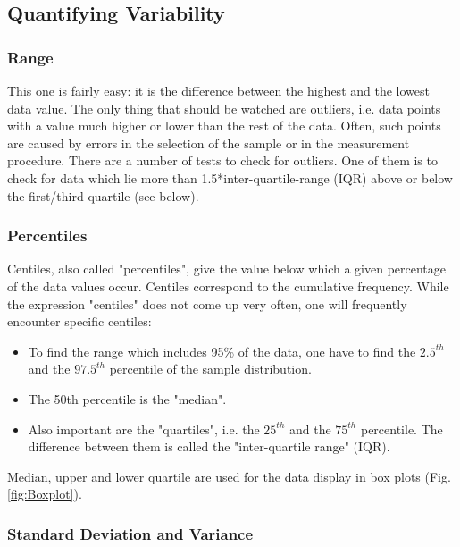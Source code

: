 \subsection{Quantifying Variability}\label{sec:centiles}

\subsubsection{Range}

This one is fairly easy: it is the difference between the highest and the lowest data value.
The only thing that should be watched are outliers, i.e. data points with a value much higher or lower than the rest of the data. Often, such points are caused by errors in the selection of the sample or in the measurement procedure. There are a number of tests to check for outliers. One of them is to check for data which lie more than 1.5*inter-quartile-range (IQR) above or below the first/third quartile (see below).


\subsubsection{Percentiles}

Centiles, also called "\glspl{percentile}", give the value below which a given percentage of the data values occur. Centiles correspond to the cumulative frequency. While the expression "centiles" does not come up very often, one will frequently encounter specific centiles:

\begin{itemize}
  \item To find the range which includes 95\% of the data, one have to find the $2.5^{th}$ and the $97.5^{th}$ percentile of the sample distribution.
  \item The 50th percentile is the "median".
  \item Also important are the "quartiles", i.e. the $25^{th}$ and the $75^{th}$ percentile. The difference between them is called the "inter-quartile range" (IQR).
\end{itemize}

Median, upper and lower quartile are used for the data display in box plots (Fig. \ref{fig:Boxplot}).

\subsubsection{Standard Deviation and Variance}

